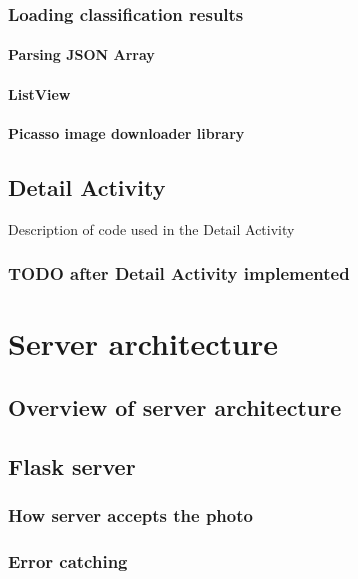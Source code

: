 \documentclass[11pt, a4paper]{report}
\begin{document}
\subsection{Loading classification results}

\subsubsection{Parsing JSON Array}

\subsubsection{ListView}

\subsubsection{Picasso image downloader library}

\section{Detail Activity}

Description of code used in the Detail Activity

\subsection{TODO after Detail Activity implemented}








\chapter{Server architecture}

\section{Overview of server architecture}

\section{Flask server}

\subsection{How server accepts the photo}

\subsection{Error catching}
\end{document}
